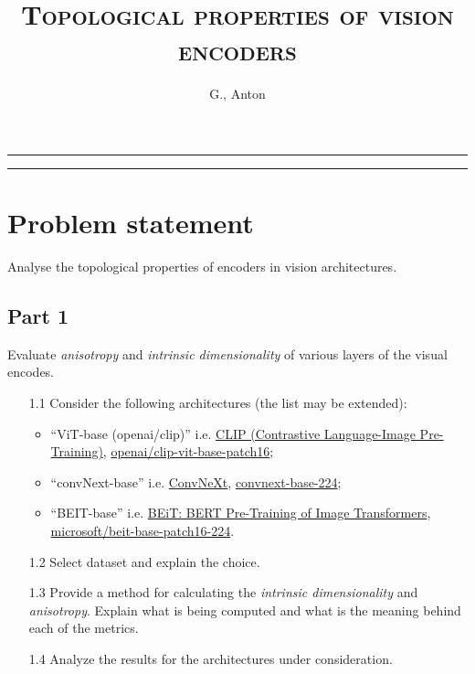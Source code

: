 \documentclass[
  11pt,
  a4paper,
  onecolumn]{article}
\author{
  G., Anton
}
\title{\textsc{Topological properties of vision encoders}}
\begin{document}
\maketitle
\par\noindent\rule{\columnwidth}{0.4pt}
\vspace{-5ex}
\tableofcontents
\vspace{-1ex}
\par\noindent\rule{\columnwidth}{0.4pt}

\section{Problem statement}\label{problem-st}

Analyse the topological properties of encoders in vision architectures.

\subsection*{Part 1}

Evaluate \textit{anisotropy} and \textit{intrinsic dimensionality} of various layers of the visual encodes.

\begin{enumerate}
  \item[1.1] Consider the following architectures (the list may be extended):
  \begin{itemize}
    \item ``ViT-base (openai/clip)'' i.e. \href{https://github.com/openai/CLIP/tree/main}{CLIP (Contrastive Language-Image Pre-Training)}, \href{https://huggingface.co/openai/clip-vit-base-patch16}{openai/clip-vit-base-patch16};
    \item ``convNext-base'' i.e. \href{https://github.com/facebookresearch/ConvNeXt}{ConvNeXt}, \href{https://huggingface.co/facebook/convnext-base-224}{convnext-base-224};
    \item ``BEIT-base'' i.e. \href{https://github.com/microsoft/unilm/tree/master/beit}{BEiT: BERT Pre-Training of Image Transformers}, \href{https://huggingface.co/microsoft/beit-base-patch16-224}{microsoft/beit-base-patch16-224}.
  \end{itemize}

  \item[1.2] Select dataset and explain the choice.
  \item[1.3] Provide a method for calculating the \textit{intrinsic dimensionality} and \textit{anisotropy}. Explain what is being computed and what is the meaning behind each of the metrics.
  \item[1.4] Analyze the results for the architectures under consideration.  
\end{enumerate}
\end{document}
